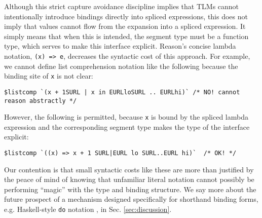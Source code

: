 \documentclass[acmsmall]{acmart}
\newcommand{\li}[1]{\lstinline[basicstyle=\ttfamily\fontsize{9pt}{1em}\selectfont]{#1}}
\begin{document}

Although this strict capture avoidance discipline implies that TLMs cannot intentionally introduce  bindings directly into spliced expressions, this does not imply that values cannot flow from the expansion into a spliced expression. It simply means that when this is intended, the segment type must be a function type, which serves to make this interface explicit. Reason's concise lambda notation, \li{(x) => e}, decreases the syntactic cost of this approach. For example, we cannot define list comprehension notation like the following because the binding site of \li{x} is not clear:
\begin{lstlisting}[numbers=none,deletekeywords={in}]
  $listcomp `(x + 1SURL | x in EURLloSURL .. EURLhi)` /* NO! cannot reason abstractly */
\end{lstlisting}
However, the following is permitted, because \li{x} is bound by the spliced lambda expression and the corresponding segment type makes the type of the interface explicit:
\begin{lstlisting}[numbers=none]
  $listcomp `((x) => x + 1 SURL|EURL lo SURL..EURL hi)`  /* OK! */
\end{lstlisting}

Our contention is that small syntactic costs like these are more than justified by the peace of mind of knowing that unfamiliar literal notation cannot possibly be performing ``magic'' with the type and binding structure. We say more about the future prospect of a  mechanism designed specifically for shorthand binding forms, e.g. Haskell-style \li{do} notation \cite{jones2003haskell}, in Sec. \ref{sec:discussion}.%



\end{document}

